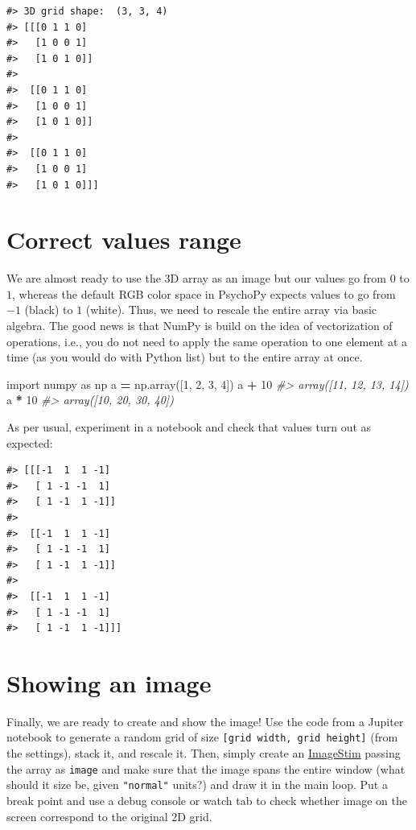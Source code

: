 \documentclass[
]{book}
\newenvironment{Shaded}{\begin{snugshade}}{\end{snugshade}}
\newcommand{\CommentTok}[1]{\textcolor[rgb]{0.56,0.35,0.01}{\textit{#1}}}
\newcommand{\DecValTok}[1]{\textcolor[rgb]{0.00,0.00,0.81}{#1}}
\newcommand{\ImportTok}[1]{#1}
\newcommand{\NormalTok}[1]{#1}
\newcommand{\OperatorTok}[1]{\textcolor[rgb]{0.81,0.36,0.00}{\textbf{#1}}}
\begin{document}
\begin{verbatim}
#> 3D grid shape:  (3, 3, 4)
#> [[[0 1 1 0]
#>   [1 0 0 1]
#>   [1 0 1 0]]
#> 
#>  [[0 1 1 0]
#>   [1 0 0 1]
#>   [1 0 1 0]]
#> 
#>  [[0 1 1 0]
#>   [1 0 0 1]
#>   [1 0 1 0]]]
\end{verbatim}

\hypertarget{correct-values-range}{%
\section{Correct values range}\label{correct-values-range}}

We are almost ready to use the 3D array as an image but our values go from \(0\) to \(1\), whereas the default RGB color space in PsychoPy expects values to go from \(-1\) (black) to \(1\) (white). Thus, we need to rescale the entire array via basic algebra. The good news is that NumPy is build on the idea of vectorization of operations, i.e., you do not need to apply the same operation to one element at a time (as you would do with Python list) but to the entire array at once.

\begin{Shaded}
\begin{Highlighting}[]
\ImportTok{import}\NormalTok{ numpy }\ImportTok{as}\NormalTok{ np}
\NormalTok{a }\OperatorTok{=}\NormalTok{ np.array([}\DecValTok{1}\NormalTok{, }\DecValTok{2}\NormalTok{, }\DecValTok{3}\NormalTok{, }\DecValTok{4}\NormalTok{])}
\NormalTok{a }\OperatorTok{+} \DecValTok{10}
\CommentTok{\#\textgreater{} array([11, 12, 13, 14])}
\NormalTok{a }\OperatorTok{*} \DecValTok{10}
\CommentTok{\#\textgreater{} array([10, 20, 30, 40])}
\end{Highlighting}
\end{Shaded}

As per usual, experiment in a notebook and check that values turn out as expected:

\begin{verbatim}
#> [[[-1  1  1 -1]
#>   [ 1 -1 -1  1]
#>   [ 1 -1  1 -1]]
#> 
#>  [[-1  1  1 -1]
#>   [ 1 -1 -1  1]
#>   [ 1 -1  1 -1]]
#> 
#>  [[-1  1  1 -1]
#>   [ 1 -1 -1  1]
#>   [ 1 -1  1 -1]]]
\end{verbatim}

\hypertarget{showing-an-image}{%
\section{Showing an image}\label{showing-an-image}}

Finally, we are ready to create and show the image! Use the code from a Jupiter notebook to generate a random grid of size \texttt{{[}grid\ width,\ grid\ height{]}} (from the settings), stack it, and rescale it. Then, simply create an \href{https://psychopy.org/api/visual/imagestim.html}{ImageStim} passing the array as \texttt{image} and make sure that the image spans the entire window (what should it size be, given \texttt{"normal"} units?) and draw it in the main loop. Put a break point and use a debug console or watch tab to check whether image on the screen correspond to the original 2D grid.
\end{document}
